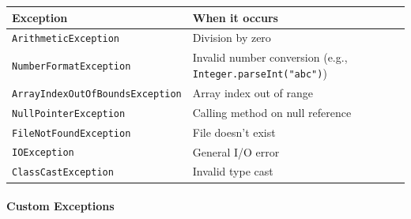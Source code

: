 \documentclass[
  justified,
  openright,
]{tufte-book}
\let\subsubsection\paragraph
\let\paragraph\paragraph
\let\subsubsection\paragraph
\let\paragraph\paragraph
\begin{document}
{\def\LTcaptype{none} %
\begin{longtable}[]{@{}
  >{\raggedright\arraybackslash}p{}
  >{\raggedright\arraybackslash}p{}@{}}
\toprule\noalign{}
\begin{minipage}[b]{\linewidth}\raggedright
Exception
\end{minipage} & \begin{minipage}[b]{\linewidth}\raggedright
When it occurs
\end{minipage} \\
\midrule\noalign{}
\endhead
\bottomrule\noalign{}
\endlastfoot
\texttt{ArithmeticException} & Division by zero \\
\texttt{NumberFormatException} & Invalid number conversion (e.g.,
\texttt{Integer.parseInt("abc")}) \\
\texttt{ArrayIndexOutOfBoundsException} & Array index out of range \\
\texttt{NullPointerException} & Calling method on null reference \\
\texttt{FileNotFoundException} & File doesn't exist \\
\texttt{IOException} & General I/O error \\
\texttt{ClassCastException} & Invalid type cast \\
\end{longtable}
}

\subsubsection{Custom Exceptions}\label{custom-exceptions}
\end{document}
